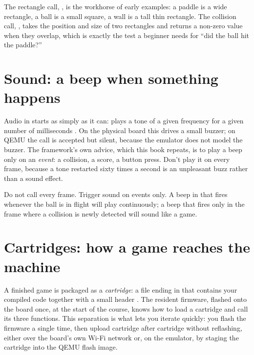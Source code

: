 The rectangle call, , is the workhorse of early examples:
a paddle is a wide rectangle, a ball is a small square, a wall is a tall thin
rectangle. The collision call, , takes the position
and size of two rectangles and returns a non-zero value when they overlap, which
is exactly the test a beginner needs for ``did the ball hit the paddle?''

\section{Sound: a beep when something happens}

Audio in \prg starts as simply as it can:  plays
a tone of a given frequency for a given number of milliseconds \citep{prg32abi}.
On the physical board this drives a small buzzer; on QEMU the call is accepted but
silent, because the emulator does not model the buzzer. The framework's own
advice, which this book repeats, is to play a beep only on an \emph{event}: a
collision, a score, a button press. Don't play it on every frame, because a tone
restarted sixty times a second is an unpleasant buzz rather than a sound effect.

\begin{prgwarn}
Do not call  every frame. Trigger sound on events only.
A beep in  that fires whenever the ball is in flight will play
continuously; a beep that fires only in the frame where a collision is newly
detected will sound like a game.
\end{prgwarn}

\section{Cartridges: how a game reaches the machine}

A finished \prg game is packaged as a \emph{cartridge}: a file ending in
 that contains your compiled \riscv code together with a small
header \citep{prg32cartfmt}. The resident firmware, flashed onto the board once,
at the start of the course, knows how to load a cartridge and call its three
functions. This separation is what lets you iterate quickly: you flash the
firmware a single time, then upload cartridge after cartridge without reflashing,
either over the board's own Wi-Fi network or, on the emulator, by staging the
cartridge into the QEMU flash image.

